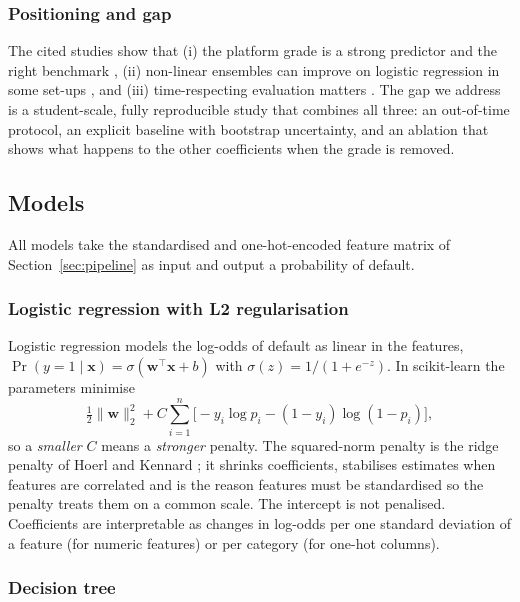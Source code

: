 \subsubsection{Positioning and gap}

The cited studies show that (i) the platform grade is a strong predictor and the right benchmark \cite{serrano2015}, (ii) non-linear ensembles can improve on logistic regression in some set-ups \cite{malekipirbazari2015}, and (iii) time-respecting evaluation matters \cite{qian2021}. The gap we address is a student-scale, fully reproducible study that combines all three: an out-of-time protocol, an explicit  baseline with bootstrap uncertainty, and an ablation that shows what happens to the other coefficients when the grade is removed.

\subsection{Models}
\label{sec:model-theory}

All models take the standardised and one-hot-encoded feature matrix of Section~\ref{sec:pipeline} as input and output a probability of default.

\subsubsection{Logistic regression with L2 regularisation}

Logistic regression models the log-odds of default as linear in the features, $\Pr(y=1\mid\mathbf{x})=\sigma(\mathbf{w}^{\top}\mathbf{x}+b)$ with $\sigma(z)=1/(1+e^{-z})$. In scikit-learn the parameters minimise
\begin{equation}
\tfrac12\lVert\mathbf{w}\rVert_2^2 + C\sum_{i=1}^{n}\Big[-y_i\log p_i-(1-y_i)\log(1-p_i)\Big],
\label{eq:lr}
\end{equation}
so a \emph{smaller} $C$ means a \emph{stronger} penalty. The squared-norm penalty is the ridge penalty of Hoerl and Kennard \cite{hoerl1970}; it shrinks coefficients, stabilises estimates when features are correlated and is the reason features must be standardised so the penalty treats them on a common scale. The intercept is not penalised. Coefficients are interpretable as changes in log-odds per one standard deviation of a feature (for numeric features) or per category (for one-hot columns).

\subsubsection{Decision tree}

